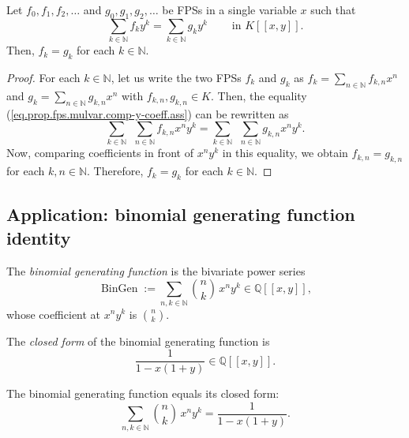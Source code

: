 \begin{proposition}
\label{prop.fps.mulvar.comp-y-coeff}
\leantarget
\leanok
Let $f_{0},f_{1},f_{2},\ldots$ and
$g_{0},g_{1},g_{2},\ldots$ be FPSs in a single variable $x$ such that
\begin{equation}
\sum_{k\in\mathbb{N}}f_{k}y^{k}=\sum_{k\in\mathbb{N}}g_{k}y^{k}%
\ \ \ \ \ \ \ \ \ \ \text{in }K\left[  \left[  x,y\right]  \right]  .
\label{eq.prop.fps.mulvar.comp-y-coeff.ass}
\end{equation}
Then, $f_{k}=g_{k}$ for each $k\in\mathbb{N}$.
\end{proposition}

\begin{proof}
For each $k\in\mathbb{N}$, let us write the two FPSs $f_{k}$ and $g_{k}$ as
$f_{k}=\sum_{n\in\mathbb{N}}f_{k,n}x^{n}$ and $g_{k}=\sum_{n\in\mathbb{N}%
}g_{k,n}x^{n}$ with $f_{k,n},g_{k,n}\in K$. Then, the equality
(\ref{eq.prop.fps.mulvar.comp-y-coeff.ass}) can be rewritten as
\[
\sum_{k\in\mathbb{N}}\ \ \sum_{n\in\mathbb{N}}f_{k,n}x^{n}y^{k}=\sum
_{k\in\mathbb{N}}\ \ \sum_{n\in\mathbb{N}}g_{k,n}x^{n}y^{k}.
\]
Now, comparing coefficients in front of $x^{n}y^{k}$ in this equality, we
obtain $f_{k,n}=g_{k,n}$ for each $k,n\in\mathbb{N}$. Therefore, $f_{k}=g_{k}$
for each $k\in\mathbb{N}$.
\end{proof}

\subsection{Application: binomial generating function identity}

\begin{definition}
\label{def.fps.mulvar.binomialGenFun}
\leanhelper
\leanok
The \emph{binomial generating function} is the bivariate power series
\[
\operatorname{BinGen} := \sum_{n,k\in\mathbb{N}} \binom{n}{k}\, x^n y^k \in \mathbb{Q}[[x,y]],
\]
whose coefficient at $x^n y^k$ is $\binom{n}{k}$.
\end{definition}

\begin{definition}
\label{def.fps.mulvar.binomialGenFunClosedForm}
\leanhelper
\leanok
The \emph{closed form} of the binomial generating function is
\[
\frac{1}{1 - x(1+y)} \in \mathbb{Q}[[x,y]].
\]
\end{definition}

\begin{theorem}
\label{thm.fps.mulvar.binomialGenFun-eq}
\leanhelper
\leanok
The binomial generating function equals its closed form:
\[
\sum_{n,k\in\mathbb{N}} \binom{n}{k}\, x^n y^k = \frac{1}{1-x(1+y)}.
\]
\end{theorem}

